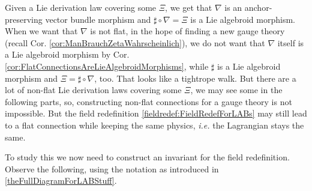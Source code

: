 Given a Lie derivation law covering some $\Xi$, we get that $\nabla$ is an anchor-preserving vector bundle morphism and $\sharp \circ \nabla = \Xi$ is a Lie algebroid morphism. When we want that $\nabla$ is not flat, in the hope of finding a new gauge theory (recall Cor. \ref{cor:ManBrauchZetaWahrscheinlich}), we do not want that $\nabla$ itself is a Lie algebroid morphism by Cor. \ref{cor:FlatConnectionsAreLieAlgebroidMorphisms}, while $\sharp$ is a Lie algebroid morphism and $\Xi = \sharp \circ \nabla$, too. That looks like a tightrope walk. But there are a lot of non-flat Lie derivation laws covering some $\Xi$, we may see some in the following parts, so, constructing non-flat connections for a gauge theory is not impossible. But the field redefinition \ref{fieldredef:FieldRedefForLABs} may still lead to a flat connection while keeping the same physics, \textit{i.e.} the Lagrangian stays the same.

%

To study this we now need to construct an invariant for the field redefinition.
Observe the following, using the notation as introduced in \eqref{theFullDiagramForLABStuff}.

